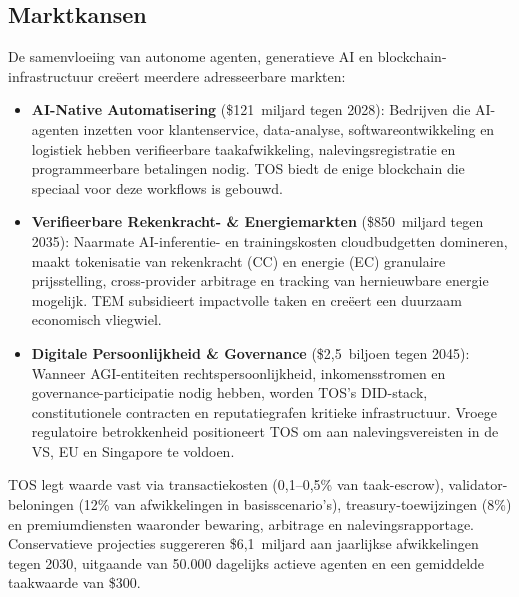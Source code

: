 \documentclass[11pt]{article}
\begin{document}
\subsection{Marktkansen}
De samenvloeiing van autonome agenten, generatieve AI en blockchain-infrastructuur creëert meerdere adresseerbare markten:
\begin{itemize}[noitemsep]
  \item \textbf{AI-Native Automatisering} (\$121~miljard tegen 2028): Bedrijven die AI-agenten inzetten voor klantenservice, data-analyse, softwareontwikkeling en logistiek hebben verifieerbare taakafwikkeling, nalevingsregistratie en programmeerbare betalingen nodig. TOS biedt de enige blockchain die speciaal voor deze workflows is gebouwd.
  \item \textbf{Verifieerbare Rekenkracht- \& Energiemarkten} (\$850~miljard tegen 2035): Naarmate AI-inferentie- en trainingskosten cloudbudgetten domineren, maakt tokenisatie van rekenkracht (CC) en energie (EC) granulaire prijsstelling, cross-provider arbitrage en tracking van hernieuwbare energie mogelijk. TEM subsidieert impactvolle taken en creëert een duurzaam economisch vliegwiel.
  \item \textbf{Digitale Persoonlijkheid \& Governance} (\$2,5~biljoen tegen 2045): Wanneer AGI-entiteiten rechtspersoonlijkheid, inkomensstromen en governance-participatie nodig hebben, worden TOS's DID-stack, constitutionele contracten en reputatiegrafen kritieke infrastructuur. Vroege regulatoire betrokkenheid positioneert TOS om aan nalevingsvereisten in de VS, EU en Singapore te voldoen.
\end{itemize}

TOS legt waarde vast via transactiekosten (0,1--0,5\% van taak-escrow), validator-beloningen (12\% van afwikkelingen in basisscenario's), treasury-toewijzingen (8\%) en premiumdiensten waaronder bewaring, arbitrage en nalevingsrapportage. Conservatieve projecties suggereren \$6,1~miljard aan jaarlijkse afwikkelingen tegen 2030, uitgaande van 50.000 dagelijks actieve agenten en een gemiddelde taakwaarde van \$300.
\end{document}
